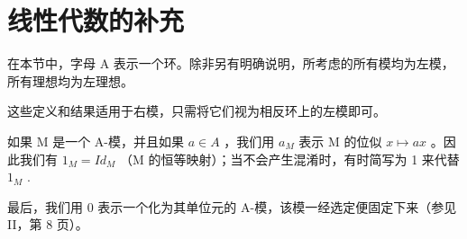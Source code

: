 \section{线性代数的补充}

在本节中，字母 A 表示一个环。除非另有明确说明，所考虑的所有模均为左模，所有理想均为左理想。

这些定义和结果适用于右模，只需将它们视为相反环上的左模即可。

如果 M 是一个 A-模，并且如果 \(a \in A\) ，我们用 \(a_{M}\) 表示 M 的位似 \(x \mapsto ax\) 。因此我们有 \(1_{M} = Id_{M}\) （M 的恒等映射）；当不会产生混淆时，有时简写为 1 来代替 \(1_{M}\) .

最后，我们用 0 表示一个化为其单位元的 A-模，该模一经选定便固定下来（参见 II，第 8 页）。

